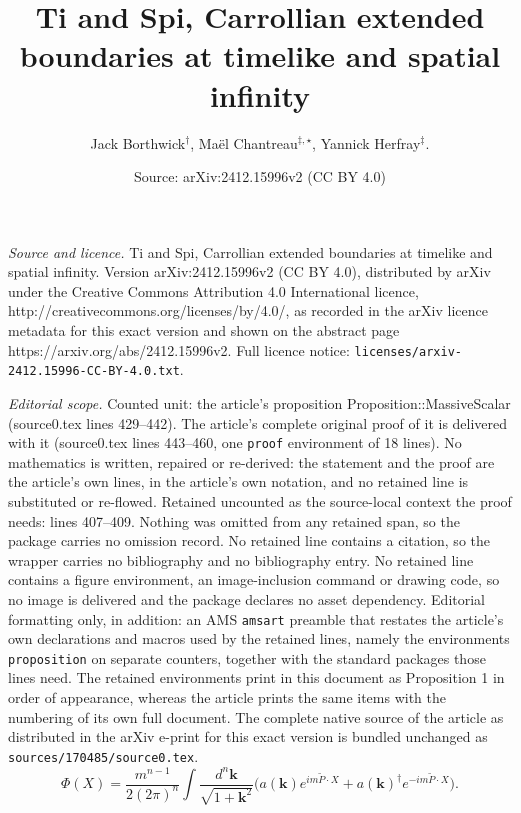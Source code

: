 \documentclass[10pt,a4paper]{amsart}
\title{Ti and Spi, Carrollian extended boundaries at timelike and spatial infinity}
\author{Jack Borthwick$^{\dagger}$, Maël Chantreau$^{\ddagger, \star}$, Yannick Herfray$^{\ddagger}$.}
\date{Source: arXiv:2412.15996v2 (CC BY 4.0)}
\newcommand{\scal}{\cdot} %
\begin{document}
\maketitle

\noindent\emph{Source and licence.} Ti and Spi, Carrollian extended boundaries at timelike and spatial infinity. Version arXiv:2412.15996v2 (CC BY 4.0), distributed by arXiv under the Creative Commons Attribution 4.0 International licence, http://creativecommons.org/licenses/by/4.0/, as recorded in the arXiv licence metadata for this exact version and shown on the abstract page https://arxiv.org/abs/2412.15996v2. Full licence notice: \texttt{licenses/arxiv-2412.15996-CC-BY-4.0.txt}.\par\smallskip

\noindent\textit{Editorial scope.} Counted unit: the article's proposition Proposition::MassiveScalar (source0.tex lines 429--442). The article's complete original proof of it is delivered with it (source0.tex lines 443--460, one \texttt{proof} environment of 18 lines). No mathematics is written, repaired or re-derived: the statement and the proof are the article's own lines, in the article's own notation, and no retained line is substituted or re-flowed.  Retained uncounted as the source-local context the proof needs: lines 407--409.  Nothing was omitted from any retained span, so the package carries no omission record.  No retained line contains a citation, so the wrapper carries no bibliography and no bibliography entry.  No retained line contains a figure environment, an image-inclusion command or drawing code, so no image is delivered and the package declares no asset dependency.  Editorial formatting only, in addition: an AMS \texttt{amsart} preamble that restates the article's own declarations and macros used by the retained lines, namely the environments \texttt{proposition} on separate counters, together with the standard packages those lines need.  The retained environments print in this document as Proposition 1 in order of appearance, whereas the article prints the same items with the numbering of its own full document.  The complete native source of the article as distributed in the arXiv e-print for this exact version is bundled unchanged as \texttt{sources/170485/source0.tex}.
\begin{equation}\label{Massive scalar field: Fourier coefficients}
    \Phi(X) = \frac{m^{n-1}}{2 (2\pi)^n}\int \frac{d^{n}\bm{k}}{\sqrt{1 + \bm{k}^2}} \Big( a(\bm{k}) e^{i m \tilde{P} \scal X} + a(\bm{k})^{\dagger} e^{-i m \tilde{P} \scal X}\Big).
\end{equation}
\end{document}
